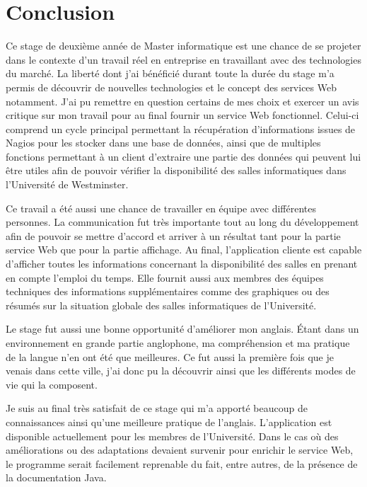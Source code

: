 \chapter{Conclusion}

Ce stage de deuxi\`eme ann\'ee de Master informatique est une chance de se projeter dans le contexte d'un travail r\'eel en entreprise en travaillant avec des technologies du march\'e.
La libert\'e dont j'ai b\'en\'efici\'e durant toute la dur\'ee du stage m'a permis de d\'ecouvrir de nouvelles technologies et le concept des services Web notamment.
J'ai pu remettre en question certains de mes choix et exercer un avis critique sur mon travail pour au final fournir un service Web fonctionnel.
Celui-ci comprend un cycle principal permettant la r\'ecup\'eration d'informations issues de Nagios pour les stocker dans une base de donn\'ees, ainsi que de multiples fonctions permettant \`a un client d'extraire une partie des donn\'ees qui peuvent lui \^etre utiles afin de pouvoir v\'erifier la disponibilit\'e des salles informatiques dans l'Universit\'e de Westminster.

Ce travail a \'et\'e aussi une chance de travailler en \'equipe avec diff\'erentes personnes.
La communication fut tr\`es importante tout au long du d\'eveloppement afin de pouvoir se mettre d'accord et arriver \`a un r\'esultat tant pour la partie service Web que pour la partie affichage.
Au final, l'application cliente est capable d'afficher toutes les informations concernant la disponibilit\'e des salles en prenant en compte l'emploi du temps.
Elle fournit aussi aux membres des \'equipes techniques des informations suppl\'ementaires comme des graphiques ou des r\'esum\'es sur la situation globale des salles informatiques de l'Universit\'e.

Le stage fut aussi une bonne opportunit\'e d'am\'eliorer mon anglais.
\'Etant dans un environnement en grande partie anglophone, ma compr\'ehension et ma pratique de la langue n'en ont \'et\'e que meilleures.
Ce fut aussi la premi\`ere fois que je venais dans cette ville, j'ai donc pu la d\'ecouvrir ainsi que les diff\'erents modes de vie qui la composent.

Je suis au final tr\`es satisfait de ce stage qui m'a apport\'e beaucoup de connaissances ainsi qu'une meilleure pratique de l'anglais.
L'application est disponible actuellement pour les membres de l'Universit\'e.
Dans le cas o\`u des am\'eliorations ou des adaptations devaient survenir pour enrichir le service Web, le programme serait facilement reprenable du fait, entre autres, de la pr\'esence de la documentation Java.

\clearpage
